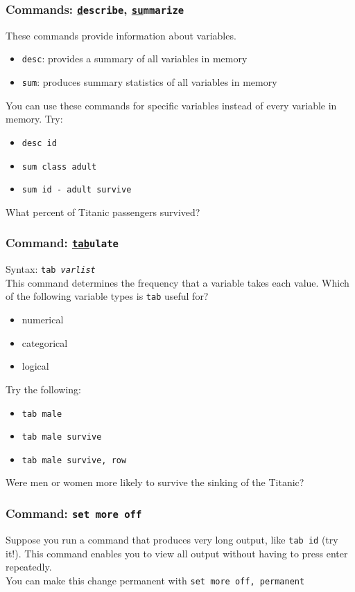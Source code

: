 \documentclass[11pt]{beamer}
\begin{document}
\begin{frame}
\frametitle{Commands: \texttt{\underline{d}escribe}, \texttt{\underline{su}mmarize}}
These commands provide information about variables.
\begin{itemize} \itemsep1em
	\item \texttt{desc}: provides a summary of all variables in memory 
	\item \texttt{sum}: produces summary statistics of all variables in memory
\end{itemize} \pause \bigskip
You can use these commands for specific variables instead of every variable in memory. Try:
\begin{itemize} 
	\item \texttt{desc id}
	\item \texttt{sum class adult}
	\item \texttt{sum id - adult survive}
\end{itemize} \pause
What percent of Titanic passengers survived?
\end{frame}

\begin{frame}
\frametitle{Command: \texttt{\underline{tab}ulate}}
Syntax: \texttt{tab \textit{varlist}} \\ \medskip
This command determines the frequency that a variable takes each value. \pause Which of the following variable types is \texttt{tab} useful for?
\begin{itemize}
	\item numerical
	\item categorical
	\item logical
\end{itemize} \pause \bigskip
Try the following:
\begin{itemize}
	\item \texttt{tab male}
	\item \texttt{tab male survive}
	\item \texttt{tab male survive, row}	
\end{itemize} \pause \bigskip
Were men or women more likely to survive the sinking of the Titanic?
\end{frame}

\begin{frame}
\frametitle{Command: \texttt{set more off}}
Suppose you run a command that produces very long output, like \texttt{tab id} (try it!). This command enables you to view all output without having to press enter repeatedly. \\ \pause \bigskip
You can make this change permanent with \texttt{set more off, permanent}
\end{frame}
\end{document}
